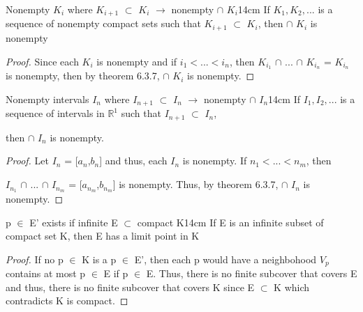	\vspace{0.5cm}



	\begin{corollary}{Nonempty $K_i$ where $K_{i+1}$ $\subset$ $K_i$
	$\rightarrow$ nonempty $\cap$ $K_i$}{14cm}
		If $K_1, K_2, ...$ is a sequence of nonempty compact sets
		such that $K_{i+1}$ $\subset$ $K_i$, then $\cap$ $K_i$ is nonempty 
	\end{corollary}
	
	\begin{proof}
		Since each $K_i$ is nonempty and if $i_1 < ... < i_n$, then
		$K_{i_1}$ $\cap$ ... $\cap$ $K_{i_n}$
		= $K_{i_n}$ is nonempty, then
		by {\color{red} theorem 6.3.7}, $\cap$ $K_i$ is nonempty.
	\end{proof}

	\vspace{0.5cm}




	\begin{wtheorem}{Nonempty intervals $I_n$ where
	$I_{n+1}$ $\subset$ $I_n$ $\rightarrow$ nonempty $\cap$ $I_n$}{14cm}
		If $I_1, I_2, ...$ is a sequence of intervals in $\mathbb{R}^1$
		such that $I_{n+1}$ $\subset$ $I_n$,
		
		then $\cap$ $I_n$ is nonempty.
	\end{wtheorem}
	
	\begin{proof}
		Let $I_n$ = [$a_n$,$b_n$] and thus, each $I_n$ is nonempty.
		If $n_1 < ... < n_m$, then

		$I_{n_1}$ $\cap$ ... $\cap$ $I_{n_m}$
		= [$a_{n_m}$,$b_{n_m}$] is nonempty.
		Thus, by {\color{red} theorem 6.3.7}, $\cap$ $I_n$ is nonempty.	
	\end{proof}

	\vspace{0.5cm}



	\begin{wtheorem}{p $\in$ E' exists if
	infinite E $\subset$ compact K}{14cm}
		If E is an infinite subset of compact set K, then E has a
		limit point in K
	\end{wtheorem}
	
	\begin{proof}
		If no p $\in$ K is a p $\in$ E', then each p would have
		a neighbohood $V_p$ contains at most p $\in$ E if p $\in$ E.
		Thus, there is no finite subcover that covers E and thus,
		there is no finite subcover that covers K since E $\subset$ K
		which contradicts K is compact.
	\end{proof}

